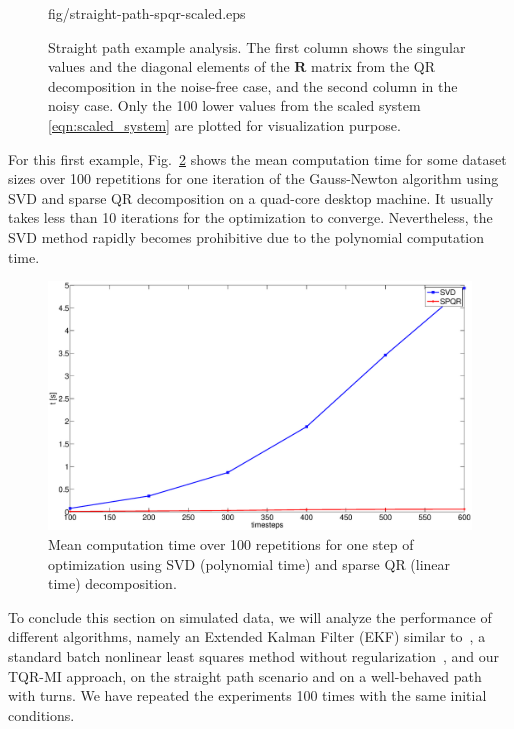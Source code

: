 \begin{figure}[t]
\begin{minipage}{.492\columnwidth}
    {fig/straight-path-spqr-scaled.eps}
\end{minipage}
\caption{Straight path example analysis. The first column shows the singular
  values and the diagonal elements of the $\mathbf{R}$ matrix from the QR
  decomposition in the noise-free case, and the second column in the noisy
  case. Only the 100 lower values from the scaled system
  \eqref{eqn:scaled_system} are plotted for visualization purpose.}
\label{fig:straight-path-analysis}
\end{figure}

For this first example, Fig.~\ref{fig:straight-path-time} shows the mean
computation time for some dataset sizes over 100 repetitions for one iteration
of the Gauss-Newton algorithm using SVD and sparse QR decomposition on a
quad-core desktop machine. It usually takes less than 10 iterations for the
optimization to converge. Nevertheless, the SVD method rapidly becomes
prohibitive due to the polynomial computation time.

\begin{figure}[t]
\centering
\includegraphics[width=\columnwidth]{fig/straight-path-time.eps}
\caption{Mean computation time over 100 repetitions for one step of
  optimization using SVD (polynomial time) and sparse QR (linear time)
  decomposition.}
\label{fig:straight-path-time}
\end{figure}

To conclude this section on simulated data, we will analyze the performance of
different algorithms, namely an Extended Kalman Filter (EKF) similar
to~\cite{martinelli06automatic}, a standard batch nonlinear least squares
method without regularization~\cite{kuemmerle11simultaneous}, and our TQR-MI
approach, on the straight path scenario and on a well-behaved path with turns.
We have repeated the experiments 100 times with the same initial conditions.


